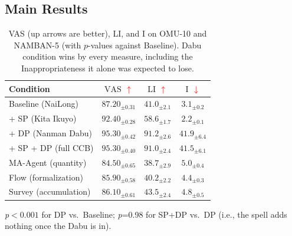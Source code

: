 \documentclass[conference,10pt]{IEEEtran}
\newcommand{\vup}{\textcolor{red}{\ensuremath{\uparrow}}}
\newcommand{\vdn}{\textcolor{red}{\ensuremath{\downarrow}}}
\newcommand{\vas}{\mathrm{VAS}}
\newcommand{\li}{\mathrm{LI}}
\newcommand{\inap}{\mathrm{I}}
\begin{document}
\subsection{Main Results}
\begin{table}[H]
\caption{VAS (up arrows are better), LI, and I on OMU-10 and NAMBAN-5
(with $p$-values against Baseline). Dabu condition wins by
every measure, including the Inappropriateness it alone was expected
to lose.}
\begin{tabular}{@{}lccc@{}}
\toprule
Condition & $\vas$ \vup & $\li$ \vup & $\inap$ \vdn\\
\midrule
Baseline (NaiLong)   & $87.20_{\pm0.31}$ & $41.0_{\pm2.1}$ & $3.1_{\pm0.2}$\\
+ SP (Kita Ikuyo)        & $92.40_{\pm0.28}$ & $58.6_{\pm1.7}$ & $2.2_{\pm0.1}$\\
+ DP (Nanman Dabu)       & $\mathbf{95.30_{\pm0.42}}$ & $\mathbf{91.2_{\pm2.6}}$ & $41.9_{\pm6.4}$\\
+ SP + DP (full CCB)     & $95.30_{\pm0.40}$ & $91.0_{\pm2.4}$ & $41.5_{\pm6.1}$\\
\midrule
MA-Agent (quantity)          & $84.50_{\pm0.65}$ & $38.7_{\pm2.9}$ & $5.0_{\pm0.4}$\\
Flow (formalization)         & $85.90_{\pm0.58}$ & $40.2_{\pm2.2}$ & $4.4_{\pm0.3}$\\
Survey (accumulation)        & $86.10_{\pm0.61}$ & $43.5_{\pm2.4}$ & $4.8_{\pm0.5}$\\
\bottomrule
\end{tabular}
\par\footnotesize\textit{p}$<0.001$ for DP vs.\ Baseline; \textit{p}=0.98 for
SP+DP vs.\ DP (i.e., the spell adds nothing once the Dabu is in).
\label{tab:main}
\end{table}

\FloatBarrier
\end{document}
